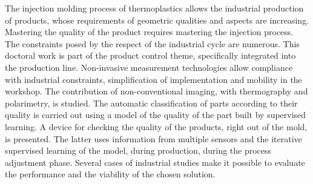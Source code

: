 The injection molding process of thermoplastics allows the industrial production of products, whose requirements of geometric qualities and aspects are increasing. Mastering the quality of the product requires mastering the injection process. The constraints posed by the respect of the industrial cycle are numerous. This doctoral work is part of the product control theme, specifically integrated into the production line. Non-invasive measurement technologies allow compliance with industrial constraints, simplification of implementation and mobility in the workshop. The contribution of non-conventional imaging, with thermography and polarimetry, is studied. The automatic classification of parts according to their quality is carried out using a model of the quality of the part built by supervised learning. A device for checking the quality of the products, right out of the mold, is presented. The latter uses information from multiple sensors and the iterative supervised learning of the model, during production, during the process adjustment phase. Several cases of industrial studies make it possible to evaluate the performance and the viability of the chosen solution.
